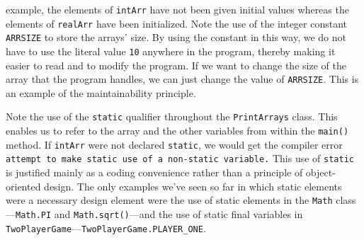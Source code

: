 \noindent example, the elements of \mbox{\tt intArr} have not been given initial
values whereas the elements of \mbox{\tt realArr} have been
initialized.  Note the use of the integer constant
\mbox{\tt ARRSIZE} to store the arrays' size.  By using the constant
in this way, we do not have to use the literal value {\tt 10} anywhere
in the program, thereby making it easier to read and to modify the
program.  If we want to change the size of the array that the program
handles, we can just change the value of {\tt ARRSIZE}. This is an
example
of the maintainability
principle.


\noindent Note the use of the {\tt static} qualifier throughout the
{\tt PrintArrays} class. This enables us to refer to the array
and the other variables from within the {\tt main()} method. If
{\tt intArr} were not declared {\tt static}, we would get the
compiler error {\tt attempt to make static use of a non-static variable.}
This use of {\tt static} is justified mainly as a coding convenience
rather than a principle of object-oriented design. The only examples
we've seen so far in which static elements were a necessary design
element were the use of static elements in the {\tt Math} class---{\tt Math.PI} 
and {\tt Math.sqrt()}---and the use of static
final variables in {\tt TwoPlayerGame}---{\tt TwoPlayerGame.PLAYER\_ONE}.


